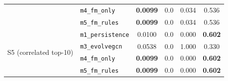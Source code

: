 \begin{table}[!htbp]
\begin{tabular}{l l c c c c}
& \texttt{m4\_fm\_only}    & \textbf{0.0099} & 0.0 & 0.034 & 0.536 \\
& \texttt{m5\_fm\_rules}   & \textbf{0.0099} & 0.0 & 0.034 & 0.536 \\
\midrule
\multirow{4}{*}{S5 (correlated top-10)}
& \texttt{m1\_persistence} & 0.0100 & 0.0 & 0.000 & \textbf{0.602} \\
& \texttt{m3\_evolvegcn}   & 0.0538 & 0.0 & 1.000 & 0.330 \\
& \texttt{m4\_fm\_only}    & \textbf{0.0099} & 0.0 & 0.000 & \textbf{0.602} \\
& \texttt{m5\_fm\_rules}   & \textbf{0.0099} & 0.0 & 0.000 & \textbf{0.602} \\
\bottomrule
\end{tabular}
\end{table}
